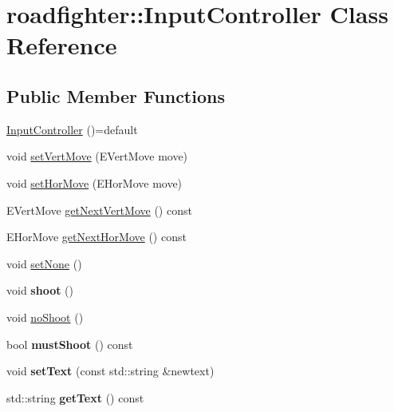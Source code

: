 \hypertarget{classroadfighter_1_1InputController}{}\section{roadfighter\+:\+:Input\+Controller Class Reference}
\label{classroadfighter_1_1InputController}
\subsection*{Public Member Functions}
\begin{DoxyCompactItemize}
\item 
\hyperlink{classroadfighter_1_1InputController_ae1647309708d4053f7f993452436c6de}{Input\+Controller} ()=default
\item 
void \hyperlink{classroadfighter_1_1InputController_a02d3a5d5c84eee14ff52adb92d4367cb}{set\+Vert\+Move} (E\+Vert\+Move move)
\item 
void \hyperlink{classroadfighter_1_1InputController_a1b1efa38b003c59f50dbafcd20d781e4}{set\+Hor\+Move} (E\+Hor\+Move move)
\item 
E\+Vert\+Move \hyperlink{classroadfighter_1_1InputController_a345eeddef99bff95e238f9dd822daf77}{get\+Next\+Vert\+Move} () const
\item 
E\+Hor\+Move \hyperlink{classroadfighter_1_1InputController_aef3c083d96e5478256255aa77f2d964e}{get\+Next\+Hor\+Move} () const
\item 
void \hyperlink{classroadfighter_1_1InputController_a729813bffe0b3180acc07ce54f6c7078}{set\+None} ()
\item 
\mbox{\label{classroadfighter_1_1InputController_a63ba4cb79605531878f2e12f5564194a}} 
void {\bfseries shoot} ()
\item 
void \hyperlink{classroadfighter_1_1InputController_a0bc4209941f91c548673f85905fb3ead}{no\+Shoot} ()
\item 
\mbox{\label{classroadfighter_1_1InputController_aba6e5f98ed035840c5319b17c3291046}} 
bool {\bfseries must\+Shoot} () const
\item 
\mbox{\label{classroadfighter_1_1InputController_a962ec0e6e8247ca42db314c04ce65399}} 
void {\bfseries set\+Text} (const std\+::string \&newtext)
\item 
\mbox{\label{classroadfighter_1_1InputController_ae8e47099a39fd61e18cdd89b34fb5d5c}} 
std\+::string {\bfseries get\+Text} () const
\end{DoxyCompactItemize}


